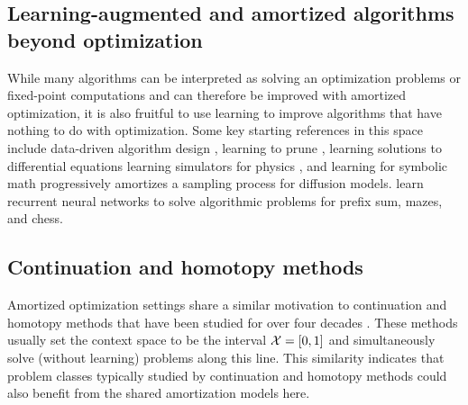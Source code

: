 \documentclass[twoside,11pt]{article}
\begin{document}
\subsection{Learning-augmented and amortized algorithms beyond optimization}
While many algorithms can be interpreted as solving an
optimization problems or fixed-point computations and
can therefore be improved with amortized optimization,
it is also fruitful to use learning to improve
algorithms that have nothing to do with optimization.
Some key starting references in this space include
data-driven algorithm design \citep{balcan2020data},
learning to prune \citep{alabi2019learning},
learning solutions to differential equations
\citep{li2020fourier,poli2020hypersolvers,karniadakis2021physics,kovachki2021universal,chen2021solving,blechschmidt2021three,marwah2021parametric,berto2021neural}
learning simulators for physics \citep{grzeszczuk1998neuroanimator,ladicky2015data,he2019learning,sanchez2020learning,wiewel2019latent,usman2021machine,vinuesa2021potential},
and learning for symbolic math
\citep{lample2019deep,charton2021linear,charton2021deep,drori2021neural,dascoli2022deep}
\citet{salimans2022progressive} progressively amortizes a
sampling process for diffusion models.
\citet{schwarzschild2021can} learn recurrent neural networks
to solve algorithmic problems for prefix sum, mazes, and chess.

\subsection{Continuation and homotopy methods}
Amortized optimization settings share a similar motivation to
continuation and homotopy methods that have been studied for
over four decades
\citep{richter1983continuation,watson1989modern,allgower2012numerical}.
These methods usually set the context space to be the
interval ${\mathcal{X}}=[0,1]$ and simultaneously solve (without learning)
problems along this line.
This similarity indicates that problem classes typically
studied by continuation and homotopy methods could also benefit
from the shared amortization models here.

\newpage
{}

{\footnotesize}
\end{document}
